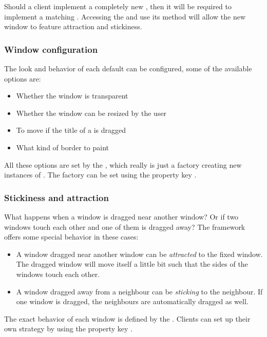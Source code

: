 
Should a client implement a completely new , then it will be required to implement a matching .
Accessing the  and use its  method will allow the new window to feature attraction and stickiness.

\subsubsection{Window configuration}
The look and behavior of each default  can be configured, some of the available options are:
\begin{itemize}
 \item Whether the window is transparent
 \item Whether the window can be resized by the user
 \item To move if the title of a  is dragged
 \item What kind of border to paint
\end{itemize}
All these options are set by the , which really is just a factory creating new instances of . The factory can be set using the property key .


\subsubsection{Stickiness and attraction}
What happens when a window is dragged near another window? Or if two windows touch each other and one of them is dragged away? The framework offers some special behavior in these cases:
\begin{itemize}
 \item A window dragged near another window can be \emph{attracted} to the fixed window. The dragged window will move itself a little bit such that the sides of the windows touch each other.
 \item A window dragged away from a neighbour can be \emph{sticking} to the neighbour. If one window is dragged, the neighbours are automatically dragged as well.
\end{itemize}
The exact behavior of each window is defined by the . Clients can set up their own strategy by using the property key \newline {}.

